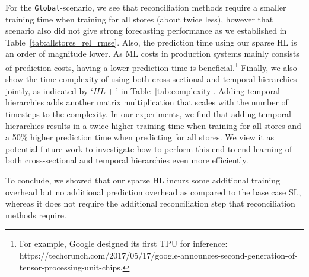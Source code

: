 \documentclass[preprint, 3p, times, twocolumn]{elsarticle}
\begin{document}
  For the \texttt{Global}-scenario, we see that reconciliation methods require a smaller training time when training for all stores (about twice less), however that scenario also did not give strong forecasting performance as we established in Table~\ref{tab:allstores_rel_rmse}. Also, the prediction time using our sparse HL is an order of magnitude lower. As ML costs in production systems mainly consists of prediction costs, having a lower prediction time is beneficial.\footnote{For example, Google designed its first TPU for inference: https://techcrunch.com/2017/05/17/google-announces-second-generation-of-tensor-processing-unit-chips.}
  Finally, we also show the time complexity of using both cross-sectional and temporal hierarchies jointly, as indicated by `\(HL+\)' in Table~\ref{tab:complexity}. Adding temporal hierarchies adds another matrix multiplication that scales with the number of timesteps to the complexity. In our experiments, we find that adding temporal hierarchies results in a twice higher training time when training for all stores and a 50\% higher prediction time when predicting for all stores. We view it as potential future work to investigate how to perform this end-to-end learning of both cross-sectional and temporal hierarchies even more efficiently. 

  To conclude, we showed that our sparse HL incurs some additional training overhead but no additional prediction overhead as compared to the base case SL, whereas it does not require the additional reconciliation step that reconciliation methods require.  
\end{document}
